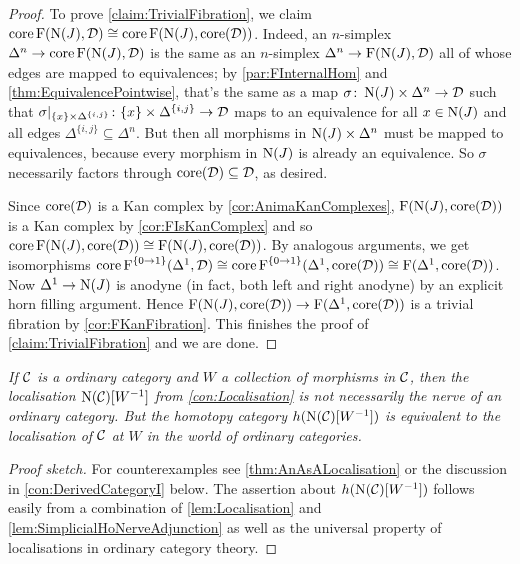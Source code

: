 \begin{proof}
	To prove \cref{claim:TrivialFibration}, we claim $\operatorname{core} \operatorname{F}(\operatorname{N}(J),\mathcal{D})\cong \operatorname{core}\operatorname{F}(\operatorname{N}(J),\operatorname{core}(\mathcal{D}))$. Indeed, an $n$-simplex $\Delta^n\rightarrow\operatorname{core} \operatorname{F}(\operatorname{N}(J),\mathcal{D})$ is the same as an $n$-simplex $\Delta^n\rightarrow \operatorname{F}(\operatorname{N}(J),\mathcal{D})$ all of whose edges are mapped to equivalences; by \cref{par:FInternalHom} and \cref{thm:EquivalencePointwise}, that's the same as a map $\sigma\colon \operatorname{N}(J)\times \Delta^n\rightarrow \mathcal{D}$ such that $\sigma|_{\{x\}\times \Delta^{\{i,j\}}}\colon \{x\}\times \Delta^{\{i,j\}}\rightarrow \mathcal{D}$ maps to an equivalence for all $x\in \operatorname{N}(J)$ and all edges $\Delta^{\{i,j\}}\subseteq \Delta^n$. But then all morphisms in $\operatorname{N}(J)\times \Delta^n$ must be mapped to equivalences, because every morphism in $\operatorname{N}(J)$ is already an equivalence. So $\sigma$ necessarily factors through $\operatorname{core}(\mathcal{D})\subseteq \mathcal{D}$, as desired.
	
	Since $\operatorname{core}(\mathcal{D})$ is a Kan complex by \cref{cor:AnimaKanComplexes}, $\operatorname{F}(\operatorname{N}(J),\operatorname{core}(\mathcal{D}))$ is a Kan complex by \cref{cor:FIsKanComplex} and so $\operatorname{core}\operatorname{F}(\operatorname{N}(J),\operatorname{core}(\mathcal{D}))\cong \operatorname{F}(\operatorname{N}(J),\operatorname{core}(\mathcal{D}))$. By analogous arguments, we get isomorphisms $\operatorname{core}\operatorname{F}^{\{0\rightarrow 1\}}(\Delta^1,\mathcal{D})\cong \operatorname{core}\operatorname{F}^{\{0\rightarrow 1\}}(\Delta^1,\operatorname{core} (\mathcal{D}))\cong \operatorname{F}(\Delta^1,\operatorname{core}(\mathcal{D}))$. Now $\Delta^1\rightarrow \operatorname{N}(J)$ is anodyne (in fact, both left and right anodyne) by an explicit horn filling argument. Hence $\operatorname{F}(\operatorname{N}(J),\operatorname{core}(\mathcal{D}))\rightarrow\operatorname{F}(\Delta^1,\operatorname{core}(\mathcal{D}))$ is a trivial fibration by \cref{cor:FKanFibration}. This finishes the proof of \cref{claim:TrivialFibration} and we are done.
\end{proof}
\begin{numpar}\label{cor:Localisation}\itshape
	If $\mathcal{C}$ is a  ordinary category and $W$ a collection of morphisms in $\mathcal{C}$, then the localisation $\operatorname{N}(\mathcal{C})[W^{-1}]$ from \cref{con:Localisation} is not necessarily the nerve of an ordinary category. But the homotopy category $h(\operatorname{N}(\mathcal{C})[W^{-1}])$ is equivalent to the localisation of $\mathcal{C}$ at $W$ in the world of ordinary categories.
\end{numpar}
\begin{proof}[Proof sketch]
	For counterexamples see \cref{thm:AnAsALocalisation} or the discussion in \cref{con:DerivedCategoryI} below. The assertion about $h(\operatorname{N}(\mathcal{C})[W^{-1}])$ follows easily from a combination of \cref{lem:Localisation} and \cref{lem:SimplicialHoNerveAdjunction} as well as the universal property of localisations in ordinary category theory.
\end{proof}

